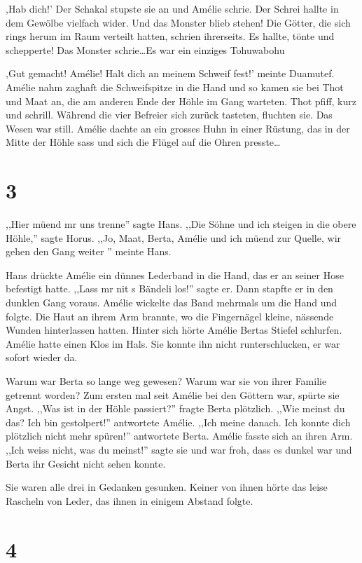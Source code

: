 \documentclass[11pt,titlepage,a5paper]{book}
\begin{document}
,Hab dich!' Der Schakal stupste sie an und Amélie schrie. Der Schrei hallte in dem Gewölbe vielfach wider. Und das Monster blieb stehen! Die Götter, die sich rings herum im Raum verteilt hatten, schrien ihrerseits. Es hallte, tönte und schepperte! Das Monster schrie\dots Es war ein einziges Tohuwabohu

,Gut gemacht! Amélie! Halt dich an meinem Schweif fest!' meinte Duamutef. Amélie nahm zaghaft die Schweifspitze in die Hand und so kamen sie bei Thot und Maat an, die am anderen Ende der Höhle im Gang warteten. Thot pfiff, kurz und schrill. Während die vier Befreier sich zurück tasteten, fluchten sie. Das Wesen war still. Amélie dachte an ein grosses Huhn in einer Rüstung, das in der Mitte der Höhle sass und sich die Flügel auf die Ohren presste\dots 

\section*{3}

,,Hier müend mr uns trenne'' sagte Hans. ,,Die Söhne und ich steigen in die obere Höhle,'' sagte Horus. ,,Jo, Maat, Berta, Amélie und ich müend zur Quelle, wir gehen den Gang weiter '' meinte Hans.

Hans drückte Amélie ein dünnes Lederband in die Hand, das er an seiner Hose befestigt hatte. ,,Lass mr nit s Bändeli los!'' sagte er. Dann stapfte er in den dunklen Gang voraus. Amélie wickelte das Band mehrmals um die Hand und folgte. Die Haut an ihrem Arm brannte, wo die Fingernägel kleine, nässende Wunden hinterlassen hatten. Hinter sich hörte Amélie Bertas Stiefel schlurfen. Amélie hatte einen Klos im Hals. Sie konnte ihn nicht runterschlucken, er war sofort wieder da.

Warum war Berta so lange weg gewesen? Warum war sie von ihrer Familie getrennt worden? Zum ersten mal seit Amélie bei den Göttern war, spürte sie Angst. ,,Was ist in der Höhle passiert?'' fragte Berta plötzlich. ,,Wie meinst du das? Ich bin gestolpert!'' antwortete Amélie. ,,Ich meine danach. Ich konnte dich plötzlich nicht mehr spüren!'' antwortete Berta. Amélie fasste sich an ihren Arm. ,,Ich weiss nicht, was du meinst!'' sagte sie und war froh, dass es dunkel war und Berta ihr Gesicht nicht sehen konnte.

Sie waren alle drei in Gedanken gesunken. Keiner von ihnen hörte das leise Rascheln von Leder, das ihnen in einigem Abstand folgte.

\section*{4}
\end{document}
